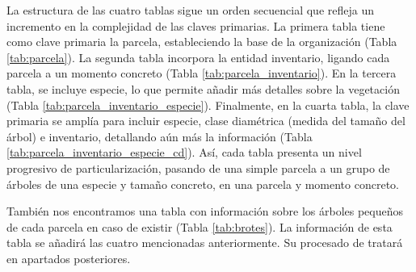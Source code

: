 \medskip

La estructura de las cuatro tablas sigue un orden secuencial que refleja un incremento en la complejidad de las claves primarias. La primera tabla tiene como clave primaria la parcela, estableciendo la base de la organización (Tabla \ref{tab:parcela}). La segunda tabla incorpora la entidad inventario, ligando cada parcela a un momento concreto (Tabla \ref{tab:parcela_inventario}). En la tercera tabla, se incluye especie, lo que permite añadir más detalles sobre la vegetación (Tabla \ref{tab:parcela_inventario_especie}). Finalmente, en la cuarta tabla, la clave primaria se amplía para incluir especie, clase diamétrica (medida del tamaño del árbol) e inventario, detallando aún más la información (Tabla \ref{tab:parcela_inventario_especie_cd}). Así, cada tabla presenta un nivel progresivo de particularización, pasando de una simple parcela a un grupo de árboles de una especie y tamaño concreto, en una parcela y momento concreto. 


También nos encontramos una tabla con información sobre los árboles pequeños de cada parcela en caso de existir (Tabla \ref{tab:brotes}). La información de esta tabla se añadirá las cuatro mencionadas anteriormente. Su procesado de tratará en apartados posteriores.

